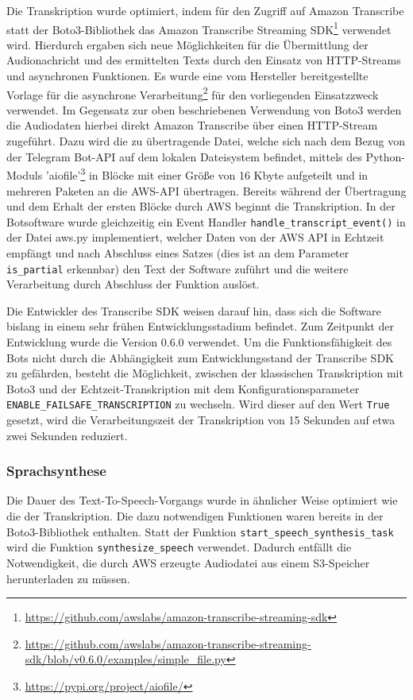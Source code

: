 Die Transkription wurde optimiert, indem für den Zugriff auf Amazon Transcribe statt der Boto3-Bibliothek das Amazon Transcribe Streaming SDK\footnote{\url{https://github.com/awslabs/amazon-transcribe-streaming-sdk}} verwendet wird. Hierdurch ergaben sich neue Möglichkeiten für die Übermittlung der Audionachricht und des ermittelten Texts durch den Einsatz von HTTP-Streams und asynchronen Funktionen. Es wurde eine vom Hersteller bereitgestellte Vorlage für die asynchrone Verarbeitung\footnote{\url{https://github.com/awslabs/amazon-transcribe-streaming-sdk/blob/v0.6.0/examples/simple\_file.py}} für den vorliegenden Einsatzzweck verwendet. Im Gegensatz zur oben beschriebenen Verwendung von Boto3 werden die Audiodaten hierbei direkt Amazon Transcribe über einen HTTP-Stream zugeführt. Dazu wird die zu übertragende Datei, welche sich nach dem Bezug von der Telegram Bot-API auf dem lokalen Dateisystem befindet, mittels des Python-Moduls 'aiofile'\footnote{\url{https://pypi.org/project/aiofile/}} in Blöcke mit einer Größe von 16 Kbyte aufgeteilt und in mehreren Paketen an die AWS-API übertragen. Bereits während der Übertragung und dem Erhalt der ersten Blöcke durch AWS beginnt die Transkription. In der Botsoftware wurde gleichzeitig ein Event Handler \lstinline{handle_transcript_event()} in der Datei aws.py implementiert, welcher Daten von der AWS API in Echtzeit empfängt und nach Abschluss eines Satzes (dies ist an dem Parameter \lstinline{is_partial} erkennbar) den Text der Software zuführt und die weitere Verarbeitung durch Abschluss der Funktion auslöst.

Die Entwickler des Transcribe SDK weisen darauf hin, dass sich die Software bislang in einem sehr frühen Entwicklungsstadium befindet. Zum Zeitpunkt der Entwicklung wurde die Version 0.6.0 verwendet. Um die Funktionsfähigkeit des Bots nicht durch die Abhängigkeit zum Entwicklungsstand der Transcribe SDK zu gefährden, besteht die Möglichkeit, zwischen der klassischen Transkription mit Boto3 und der Echtzeit-Transkription mit dem Konfigurationsparameter \lstinline{ENABLE_FAILSAFE_TRANSCRIPTION} zu wechseln. Wird dieser auf den Wert \lstinline{True} gesetzt, wird die Verarbeitungszeit der Transkription von 15 Sekunden auf etwa zwei Sekunden reduziert.

\subsubsection{Sprachsynthese}
\label{sec:optimierung-synth}

Die Dauer des Text-To-Speech-Vorgangs wurde in ähnlicher Weise optimiert wie die der Transkription. Die dazu notwendigen Funktionen waren bereits in der Boto3-Bibliothek enthalten. Statt der Funktion \lstinline{start_speech_synthesis_task} wird die Funktion \lstinline{synthesize_speech} verwendet. Dadurch entfällt die Notwendigkeit, die durch AWS erzeugte Audiodatei aus einem S3-Speicher herunterladen zu müssen. 

